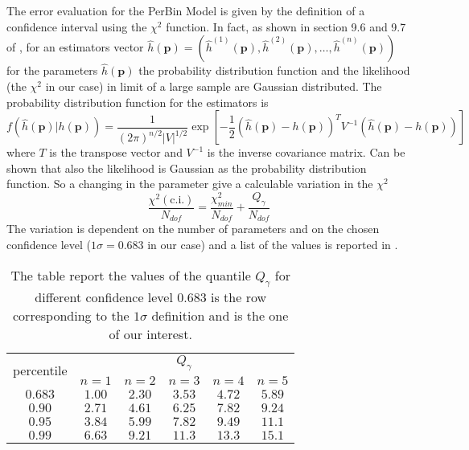 The error evaluation for the PerBin Model is given by the definition of a confidence interval using the $\chi^2$ function.
In fact, as shown in section 9.6 and 9.7 of \cite{cowan}, for an estimators vector $\hat{h}(\mathbf{p})=(\hat{h}^{(1)}(\mathbf{p}),\hat{h}^{(2)}(\mathbf{p}),\dots,\hat{h}^{(n)}(\mathbf{p}))$ for the parameters $\hat{h}(\mathbf{p})$ the probability distribution function and the likelihood (the $\chi^2$ in our case) in limit of a large sample are Gaussian distributed. The probability distribution function for the estimators is 
\begin{equation}
f(\hat{h}(\mathbf{p})|h(\mathbf{p})) = \frac{1}{(2\pi)^{n/2}|V|^{1/2}}\exp\left[ -\frac{1}{2}\left(\hat{h}(\mathbf{p}) - h(\mathbf{p})\right)^T V^{-1} \left(\hat{h}(\mathbf{p}) - h(\mathbf{p})\right) \right] 
\end{equation}
where $T$ is the transpose vector and $V^{-1}$ is the inverse covariance matrix. 
Can be shown that also the likelihood is Gaussian as the probability distribution function. So a changing in the parameter give a calculable variation in the $\chi^2$
\begin{equation}
	\frac{\chi^2(\text{c.i.})}{N_{dof}}= \frac{\chi^2_{min}}{N_{dof}}+\frac{Q_\gamma}{N_{dof}}
	\label{eq:chi2_variation}
\end{equation} 
The variation is dependent on the number of parameters and on the chosen confidence level ($1\sigma=0.683$ in our case) and a list of the values is reported in .

\begin{table}
	\centering
	\begin{tabular}{c | c c c c c}
		\multirow{ 2}{*}{percentile} & \multicolumn{5}{c}{$Q_\gamma$}\\\cline{2-6}
		& $n=1$ & $n=2$ & $n=3$ & $n=4$ & $n=5$ \\\hline\hline
		$0.683$& $ 1.00 $ & $ 2.30 $ & $ 3.53 $ & $ 4.72 $ & $ 5.89 $ \\
		$0.90$ &  $ 2.71 $ & $ 4.61 $ & $ 6.25 $ & $ 7.82 $ & $ 9.24 $ \\
		$0.95$ & $ 3.84 $ & $ 5.99 $ & $ 7.82 $ & $ 9.49 $ & $ 11.1 $ \\
		$0.99$ & $ 6.63 $ & $ 9.21 $ & $ 11.3 $ & $ 13.3 $ & $ 15.1 $ \\
	\end{tabular}
	\caption{The table report the values of the quantile $Q_\gamma$ for different confidence level $0.683$ is the row corresponding to the $1\sigma$ definition and is the one of our interest.}
	\label{table:percentile}
\end{table}

